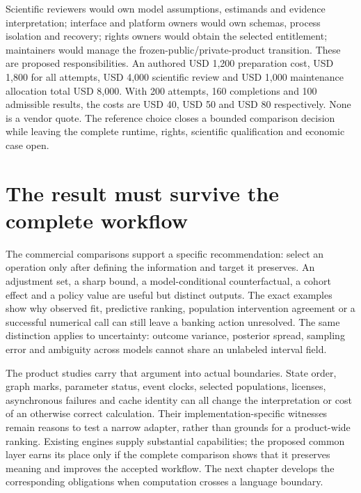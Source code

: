 Scientific reviewers would own model assumptions, estimands and evidence
interpretation; interface and platform owners would own schemas, process
isolation and recovery; rights owners would obtain the selected entitlement;
maintainers would manage the frozen-public/private-product transition. These
are proposed responsibilities. An authored USD 1,200 preparation cost,
USD 1,800 for all attempts, USD 4,000 scientific review and USD 1,000 maintenance
allocation total USD 8,000. With 200 attempts, 160 completions and 100 admissible
results, the costs are USD 40, USD 50 and USD 80 respectively. None is a vendor
quote. The reference choice closes a bounded comparison decision while leaving
the complete runtime, rights, scientific qualification and economic case open.
\citep{exec25_agena_choice}

\section{The result must survive the complete workflow}

The commercial comparisons support a specific recommendation: select an
operation only after defining the information and target it preserves. An
adjustment set, a sharp bound, a model-conditional counterfactual, a cohort
effect and a policy value are useful but distinct outputs. The exact examples
show why observed fit, predictive ranking, population intervention agreement
or a successful numerical call can still leave a banking action unresolved.
The same distinction applies to uncertainty: outcome variance, posterior
spread, sampling error and ambiguity across models cannot share an unlabeled
interval field.

The product studies carry that argument into actual boundaries. State order,
graph marks, parameter status, event clocks, selected populations, licenses,
asynchronous failures and cache identity can all change the interpretation
or cost of an otherwise correct calculation. Their implementation-specific
witnesses remain reasons to test a narrow adapter, rather than grounds for a
product-wide ranking. Existing engines supply substantial capabilities; the
proposed common layer earns its place only if the complete comparison shows
that it preserves meaning and improves the accepted workflow. The next
chapter develops the corresponding obligations when computation crosses a
language boundary.

